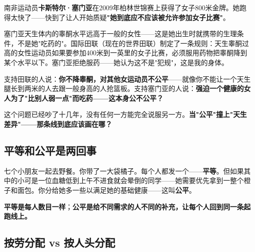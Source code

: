 \documentclass[a4paper,12pt]{ctexart}
\begin{document}
南非运动员\textbf{卡斯特尔·塞门亚}在2009年柏林世锦赛上获得了女子800米金牌。她跑得太快了——快到了让人开始质疑\textbf{"她到底应不应该被允许参加女子比赛"}。

塞门亚天生体内的睾酮水平远高于一般的女性——这是她出生时就携带的生理条件，不是她"吃药的"。国际田联（现在的世界田联）制定了一条规则：天生睾酮过高的女性运动员如果要参加400米到一英里的女子比赛，必须服用药物把睾酮降到某个水平以下。塞门亚拒绝服药——她认为这不是"犯规"，这是我的身体。

支持田联的人说：\textbf{你不降睾酮，对其他女运动员不公平}——就像你不能让一个天生腿长到两米的人去跟一般身高的人抢篮板。支持塞门亚的人说：\textbf{强迫一个健康的女人为了"比别人弱一点"而吃药——这本身公不公平？}

这个问题已经吵了十几年，没有任何一方能完全说服另一方。\textbf{当"公平"撞上"天生差异"——那条线到底应该画在哪？}


\subsection*{平等和公平是两回事}

七个小朋友一起去野餐。你带了一大袋橘子。每个人都发一个——\textbf{平等}。但如果其中的小可是一位血糖低到上午不进食就会晕倒的同学——她需要优先拿到一整个橙子和面包。你分给她多一些以满足她的基础健康——这叫\textbf{公平}。

\textbf{平等是每人数目一样}；\textbf{公平是给不同需求的人不同的补充，让每个人回到同一条起跑线上。}

\subsection*{按劳分配 vs 按人头分配}
\end{document}
